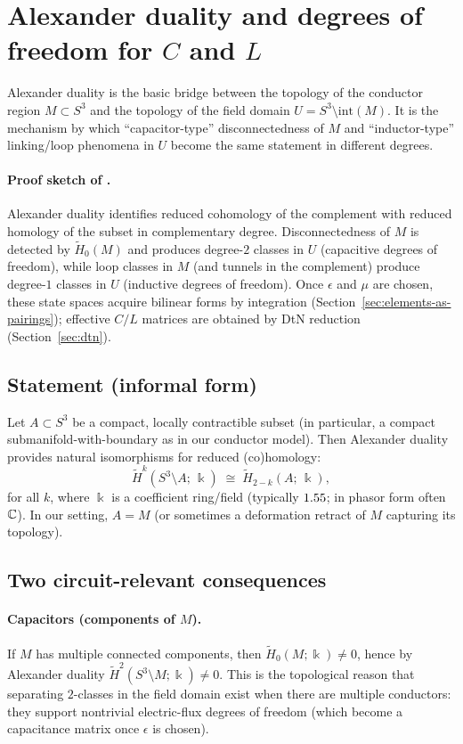 \documentclass[11pt]{article}
\begin{document}
\section{\texorpdfstring{Alexander duality and degrees of freedom for $C$ and $L$}{Alexander duality and degrees of freedom for C and L}}
\label{sec:alexander-duality}
Alexander duality is the basic bridge between the topology of the conductor region $M\subset S^3$ and the topology of the field domain $U=S^3\setminus\mathrm{int}(M)$.
It is the mechanism by which ``capacitor-type'' disconnectedness of $M$ and ``inductor-type'' linking/loop phenomena in $U$ become the same statement in different degrees.

\paragraph{Proof sketch of .}
Alexander duality identifies reduced cohomology of the complement with reduced homology of the subset in complementary degree.
Disconnectedness of $M$ is detected by $\widetilde H_0(M)$ and produces degree-$2$ classes in $U$ (capacitive degrees of freedom), while loop classes in $M$ (and tunnels in the complement) produce degree-$1$ classes in $U$ (inductive degrees of freedom).
Once $\epsilon$ and $\mu$ are chosen, these state spaces acquire bilinear forms by integration (Section~\ref{sec:elements-as-pairings}); effective $C/L$ matrices are obtained by DtN reduction (Section~\ref{sec:dtn}).

\subsection{Statement (informal form)}
Let $A\subset S^3$ be a compact, locally contractible subset (in particular, a compact submanifold-with-boundary as in our conductor model).
Then Alexander duality provides natural isomorphisms for reduced (co)homology:
\[
\widetilde H^k(S^3\setminus A;\,\Bbbk)\;\cong\;\widetilde H_{2-k}(A;\,\Bbbk),
\]
for all $k$, where $\Bbbk$ is a coefficient ring/field (typically $1.55$; in phasor form often $\mathbb{C}$).
In our setting, $A=M$ (or sometimes a deformation retract of $M$ capturing its topology).

\subsection{Two circuit-relevant consequences}
\paragraph{Capacitors (components of $M$).}
If $M$ has multiple connected components, then $\widetilde H_0(M;\Bbbk)\neq 0$, hence by Alexander duality $\widetilde H^2(S^3\setminus M;\Bbbk)\neq 0$.
This is the topological reason that separating $2$-classes in the field domain exist when there are multiple conductors: they support nontrivial electric-flux degrees of freedom (which become a capacitance matrix once $\epsilon$ is chosen).
\end{document}
